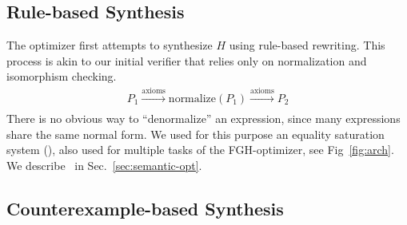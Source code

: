 \subsection{Rule-based Synthesis}
\label{subsec:rule:based:synthesis}

The optimizer first attempts to synthesize $H$ using rule-based
rewriting.  This process is akin to our initial verifier that relies
only on normalization and isomorphism checking.
%
\begin{align}
  P_{1} \xrightarrow[]{\text{axioms}} \text{normalize}(P_{1}) \xrightarrow[]{\text{axioms}} P_{2}
  \label{eq:synthesis:isomorphism}
\end{align}
%
There is no obvious way to ``denormalize'' an expression, since many
expressions share the same normal form.  We used for this purpose
an equality saturation system (\eqsat), also used for multiple tasks
of the FGH-optimizer, see Fig~\ref{fig:arch}.  We describe \eqsat\ in Sec.~\ref{sec:semantic-opt}.







\subsection{Counterexample-based Synthesis}

